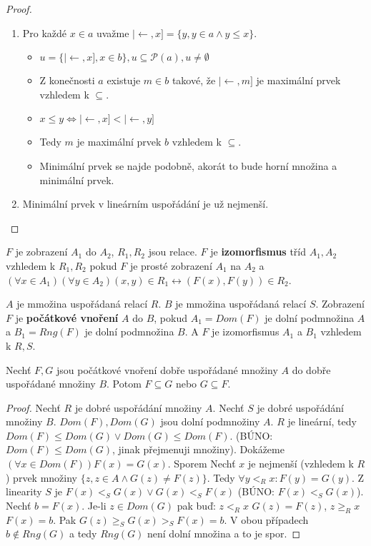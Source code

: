 \begin{proof}
	\begin{enumerate}
		\item Pro každé $x \in a$ uvažme $| \leftarrow , x] = \{y, y \in a \land y \leq x\}$.
		\begin{itemize}
			\item $u = \{|\leftarrow , x], x \in b\}, u \subseteq \mathcal{P}(a), u \neq \emptyset$
			\item Z konečnosti $a$ existuje $m \in b$ takové, že $| \leftarrow ,m]$ je maximální prvek vzhledem k $\subseteq$.
			\item $x \leq y \Leftrightarrow | \leftarrow , x] < | \leftarrow , y]$
			\item Tedy $m$ je maximální prvek $b$ vzhledem k $\subseteq$.
			\item Minimální prvek se najde podobně, akorát to bude horní množina a minimální prvek.
		\end{itemize}
		\item Minimální prvek v lineárním uspořádání je už nejmenší.
	\end{enumerate}
\end{proof}

\begin{definice}
	$F$ je zobrazení $A_{1}$ do $A_{2}$, $R_{1},R_{2}$ jsou relace. $F$ je \textbf{izomorfismus} tříd $A_{1},A_{2}$ vzhledem k $R_{1},R_{2}$ pokud $F$ je prosté zobrazení $A_{1}$ na $A_{2}$ a $(\forall x \in A_{1})(\forall y \in A_{2})(x,y) \in R_{1} \leftrightarrow (F(x),F(y)) \in R_{2}$.
\end{definice}

\begin{definice}
	$A$ je mmožina uspořádaná relací $R$. $B$ je mmožina uspořádaná relací $S$. Zobrazení $F$ je \textbf{počátkové vnoření} $A$ do $B$, pokud $A_{1} = Dom(F)$ je dolní podmnožina $A$ a $B_{1} = Rng(F)$ je dolní podmnožina $B$. A $F$ je izomorfismus $A_{1}$ a $B_{1}$ vzhledem k $R,S$.
\end{definice}

\begin{lemma}
	Nechť $F,G$ jsou počátkové vnoření dobře uspořádané množiny $A$ do dobře uspořádané množiny $B$. Potom $F \subseteq G$ nebo $G \subseteq F$.
\end{lemma}

\begin{proof}
	Nechť $R$ je dobré uspořádání množiny $A$. Nechť $S$ je dobré uspořádání množiny $B$. $Dom(F), Dom(G)$ jsou dolní podmnožiny $A$. $R$ je lineární, tedy $Dom(F) \leq Dom(G) \lor Dom(G) \leq Dom(F)$. (BÚNO: $Dom(F) \leq Dom(G)$, jinak přejmenuji množiny). Dokážeme $(\forall x \in Dom(F)) F(x) = G(x)$. Sporem Nechť $x$ je nejmenší (vzhledem k $R$) prvek množiny $\{z, z \in A \land G(z) \neq F(z)\}$. Tedy $\forall y <_{R} x : F(y) = G(y)$. Z linearity $S$ je $F(x) <_{S} G(x) \lor G(x) <_{S} F(x)$ (BÚNO: $F(x) <_{S} G(x)$). Nechť $b = F(x)$. Je-li $z \in Dom(G)$ pak buď: $z <_{R} x$ $G(z) = F(z)$, $z \geq_{R} x$ $F(x) = b$. Pak $G(z) \geq_{S} G(x) >_{S} F(x) = b$. V obou případech $b \notin Rng(G)$ a tedy $Rng(G)$ není dolní množina a to je spor.
\end{proof}

